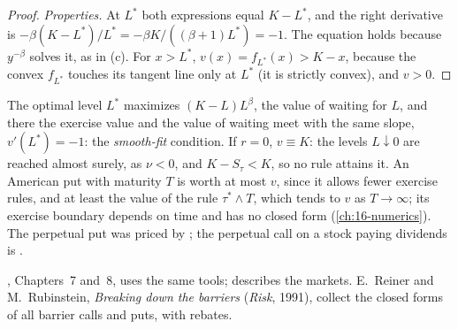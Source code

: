 \begin{proof}
\emph{Properties.} At $L^*$ both expressions equal $K-L^*$, and the right derivative is
$-\beta(K-L^*)/L^*=-\beta K/((\beta+1)L^*)=-1$. The equation holds because $y^{-\beta}$ solves it, as
in (c). For $x>L^*$, $v(x)=f_{L^*}(x)>K-x$, because the convex $f_{L^*}$ touches
its tangent line only at $L^*$ (it is strictly convex), and $v>0$.
\end{proof}

The optimal level $L^*$ maximizes $(K-L)L^\beta$, the value of waiting for $L$, and there the
exercise value and the value of waiting meet with the same slope, $v'(L^*)=-1$: the
\emph{smooth-fit} condition. If $r=0$, $v\equiv K$: the levels
$L\downarrow0$ are reached almost surely, as $\nu<0$, and $K-S_\tau<K$, so no rule attains it. An American
put with maturity $T$ is worth at most $v$, since it allows fewer exercise rules, and at least the value of the rule $\tau^*\wedge T$,
which tends to $v$ as $T\to\infty$; its exercise boundary depends on time and has no closed form
(\cref{ch:16-numerics}). The perpetual put was priced by \textcite{merton1973}; the
perpetual call on a stock paying dividends is .


\furtherreading
\textcite{shreve2}, Chapters~7 and~8, uses the same tools; \textcite{hull} describes the markets.
E.~Reiner and M.~Rubinstein, \emph{Breaking down the barriers} (\emph{Risk}, 1991), collect the
closed forms of all barrier calls and puts, with rebates.
